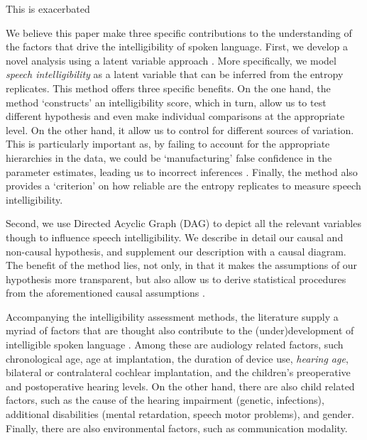 \begin{comment}
It is easy to deduce that \textit{objective rating} methods produce more valid\footnote{the extent to which scores are appropriate for their intended interpretation and use \citep{Lesterhuis_2018, Trochim_2022}.} and reliable\footnote{the extend to which a measure would give us the same result over and over again \citep{Trochim_2022}, i.e. measure something, free from error, in a consistent way.} scores than its \textit{subjective} counterpart, and as a result, are usually used as an objective measure of intelligibility \citep{Boonen_et_al_2021, Faes_et_al_2021}.

\end{comment}

This is exacerbated 

We believe this paper make three specific contributions to the understanding of the factors that drive the intelligibility of spoken language. First, we develop a novel analysis using a latent variable approach \cite{Everitt_1984}. More specifically, we model \textit{speech intelligibility} as a latent variable that can be inferred from the entropy replicates. This method offers three specific benefits. On the one hand, the method `constructs' an intelligibility score, which in turn, allow us to test different hypothesis and even make individual comparisons at the appropriate level. On the other hand, it allow us to control for different sources of variation. This is particularly important as, by failing to account for the appropriate hierarchies in the data, we could be `manufacturing' false confidence in the parameter estimates, leading us to incorrect inferences \cite{McElreath_2020}. Finally, the method also provides a `criterion' on how reliable are the entropy replicates to measure speech intelligibility.

Second, we use Directed Acyclic Graph (DAG) \cite{Pearl_2009, Cinelli_et_al_2021} to depict all the relevant variables though to influence speech intelligibility. We describe in detail our causal and non-causal hypothesis, and supplement our description with a causal diagram. The benefit of the method lies, not only, in that it makes the assumptions of our hypothesis more transparent, but also allow us to derive statistical procedures from the aforementioned causal assumptions \cite{McElreath_2020, Yarkoni_2020, Rohrer_et_al_2021}.

Accompanying the intelligibility assessment methods, the literature supply a myriad of factors that are thought also contribute to the (under)development of intelligible spoken language \cite{Niparko_et_al_2010, Boons_et_al_2012, Gillis_2018, Fagan_et_al_2020}. Among these are audiology related factors, such chronological age, age at implantation, the duration of device use, \textit{hearing age}, bilateral or contralateral cochlear implantation, and the children's preoperative and postoperative hearing levels. On the other hand, there are also child related factors, such as the cause of the hearing impairment (genetic, infections), additional disabilities (mental retardation, speech motor problems), and gender. Finally, there are also environmental factors, such as communication modality. 


